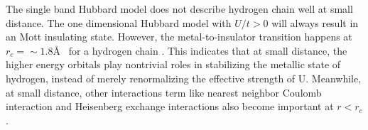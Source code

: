 The single band Hubbard model does not describe hydrogen chain well at small distance. The one dimensional Hubbard model with $U/t>0$ will always result in an Mott insulating state. However, the metal-to-insulator transition happens at $r_c=\sim1.8$\AA~ for a hydrogen chain \cite{Stella2011}. This indicates that at small distance, the higher energy orbitals play nontrivial roles in stabilizing the metallic state of hydrogen, instead of merely renormalizing the effective strength of U. Meanwhile, at small distance, other interactions term like nearest neighbor Coulomb interaction and Heisenberg exchange interactions also become important at $r<r_c$ \cite{ZhengThesis}. 


